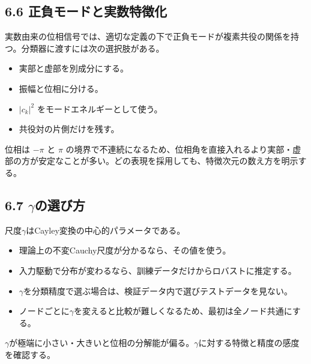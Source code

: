 \documentclass[11pt,a4paper]{ltjsarticle}
\begin{document}
\subsection*{\textcolor{researchblue}{6.6 正負モードと実数特徴化}}

実数由来の位相信号では、適切な定義の下で正負モードが複素共役の関係を持つ。分類器に渡すには次の選択肢がある。\par

\begin{itemize}

\item 実部と虚部を別成分にする。

\item 振幅と位相に分ける。

\item \(|c_k|^2\) をモードエネルギーとして使う。

\item 共役対の片側だけを残す。

\end{itemize}

位相は \(-\pi\) と \(\pi\) の境界で不連続になるため、位相角を直接入れるより実部・虚部の方が安定なことが多い。どの表現を採用しても、特徴次元の数え方を明示する。\par

\subsection*{\textcolor{researchblue}{6.7 \(\gamma\)の選び方}}

尺度\(\gamma\)はCayley変換の中心的パラメータである。\par

\begin{itemize}

\item 理論上の不変Cauchy尺度が分かるなら、その値を使う。

\item 入力駆動で分布が変わるなら、訓練データだけからロバストに推定する。

\item \(\gamma\)を分類精度で選ぶ場合は、検証データ内で選びテストデータを見ない。

\item ノードごとに\(\gamma\)を変えると比較が難しくなるため、最初は全ノード共通にする。

\end{itemize}

\(\gamma\)が極端に小さい・大きいと位相の分解能が偏る。\(\gamma\)に対する特徴と精度の感度を確認する。\par
\end{document}

